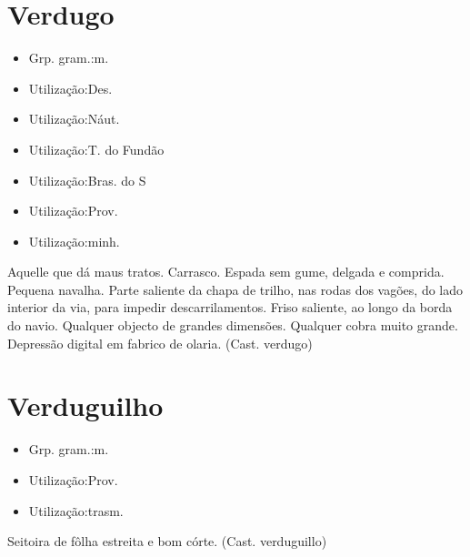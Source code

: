 \documentclass{article}
\begin{document}
\section{Verdugo}
\begin{itemize}
\item {Grp. gram.:m.}
\end{itemize}
\begin{itemize}
\item {Utilização:Des.}
\end{itemize}
\begin{itemize}
\item {Utilização:Náut.}
\end{itemize}
\begin{itemize}
\item {Utilização:T. do Fundão}
\end{itemize}
\begin{itemize}
\item {Utilização:Bras. do S}
\end{itemize}
\begin{itemize}
\item {Utilização:Prov.}
\end{itemize}
\begin{itemize}
\item {Utilização:minh.}
\end{itemize}
Aquelle que dá maus tratos.
Carrasco.
Espada sem gume, delgada e comprida.
Pequena navalha.
Parte saliente da chapa de trilho, nas rodas dos vagões, do lado interior da via, para impedir descarrilamentos.
Friso saliente, ao longo da borda do navio.
Qualquer objecto de grandes dimensões.
Qualquer cobra muito grande.
Depressão digital em fabrico de olaria.
(Cast. \textunderscore verdugo\textunderscore )
\section{Verduguilho}
\begin{itemize}
\item {Grp. gram.:m.}
\end{itemize}
\begin{itemize}
\item {Utilização:Prov.}
\end{itemize}
\begin{itemize}
\item {Utilização:trasm.}
\end{itemize}
Seitoira de fôlha estreita e bom córte.
(Cast. \textunderscore verduguillo\textunderscore )
\end{document}
